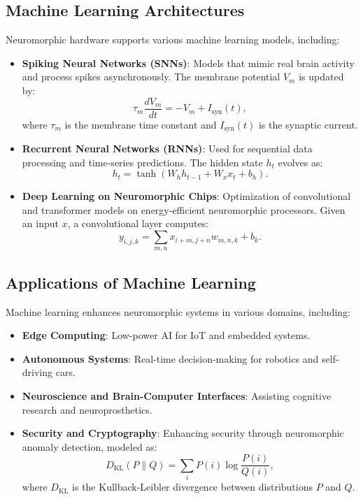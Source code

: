\documentclass{article}
\theoremstyle{plain}
\begin{document}
\begin{itemize}
\begin{itemize}
\subsection{Machine Learning Architectures}
Neuromorphic hardware supports various machine learning models, including:
\begin{itemize}
    \item \textbf{Spiking Neural Networks (SNNs)}: Models that mimic real brain activity and process spikes asynchronously. The membrane potential $V_m$ is updated by:
    \begin{equation}
        \tau_m \frac{dV_m}{dt} = - V_m + I_{\text{syn}}(t),
    \end{equation}
    where $\tau_m$ is the membrane time constant and $I_{\text{syn}}(t)$ is the synaptic current.
    
    \item \textbf{Recurrent Neural Networks (RNNs)}: Used for sequential data processing and time-series predictions. The hidden state $h_t$ evolves as:
    \begin{equation}
        h_t = \tanh(W_h h_{t-1} + W_x x_t + b_h).
    \end{equation}
    
    \item \textbf{Deep Learning on Neuromorphic Chips}: Optimization of convolutional and transformer models on energy-efficient neuromorphic processors. Given an input $x$, a convolutional layer computes:
    \begin{equation}
        y_{i,j,k} = \sum_{m,n} x_{i+m, j+n} w_{m,n,k} + b_k.
    \end{equation}
\end{itemize}

\subsection{Applications of Machine Learning}
Machine learning enhances neuromorphic systems in various domains, including:
\begin{itemize}
    \item \textbf{Edge Computing}: Low-power AI for IoT and embedded systems.
    \item \textbf{Autonomous Systems}: Real-time decision-making for robotics and self-driving cars.
    \item \textbf{Neuroscience and Brain-Computer Interfaces}: Assisting cognitive research and neuroprosthetics.
    \item \textbf{Security and Cryptography}: Enhancing security through neuromorphic anomaly detection, modeled as:
    \begin{equation}
        D_{\text{KL}}(P \| Q) = \sum_i P(i) \log \frac{P(i)}{Q(i)},
    \end{equation}
    where $D_{\text{KL}}$ is the Kullback-Leibler divergence between distributions $P$ and $Q$.
\end{itemize}


\end{itemize}
\end{itemize}
\end{document}
